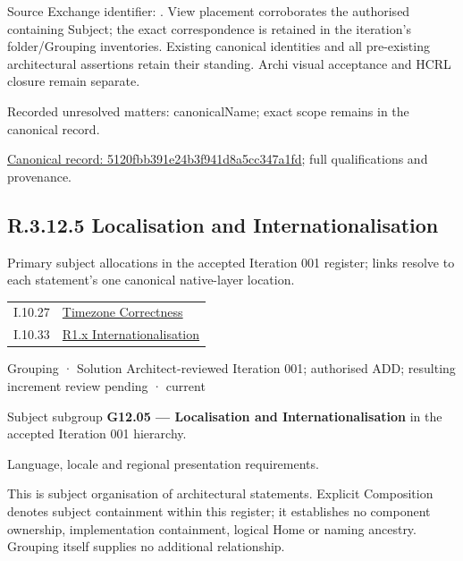 Source Exchange identifier: \texttt{}. View placement corroborates
the authorised containing Subject; the exact correspondence is retained in the
iteration's folder/Grouping inventories. Existing canonical identities and all
pre-existing architectural assertions retain their standing. Archi visual
acceptance and HCRL closure remain separate.


{\small Recorded unresolved matters: canonicalName; exact scope remains in the canonical record.}\par
{\footnotesize \href{../../../../continuum/grouping/5120fbb391e24b3f941d8a5cc347a1fd.md}{Canonical record: 5120fbb391e24b3f941d8a5cc347a1fd}; full qualifications and provenance.}\par
\subsection*{R.3.12.5 Localisation and Internationalisation}
\label{navigation:R.3.12.5}

Primary subject allocations in the accepted Iteration 001 register; links resolve to each statement’s one canonical native-layer location.\par
\begin{longtable}{p{.22\linewidth}p{.73\linewidth}}
I.10.27 & \hyperref[element:3da1fba95a00438db09c342dfba8b693]{Timezone Correctness} \\
I.10.33 & \hyperref[element:920606fdc7c14a27b7e39a08105c77b6]{R1.x Internationalisation} \\
\end{longtable}
\label{element:77cd076a5bdf463a93fe330698d9be19}
{\small Grouping · Solution Architect-reviewed Iteration 001; authorised ADD; resulting increment review pending · current}\par

Subject subgroup \textbf{G12.05 — Localisation and Internationalisation} in the accepted Iteration 001 hierarchy.



Language, locale and regional presentation requirements.



This is subject organisation of architectural statements. Explicit Composition denotes subject containment within this register; it establishes no component ownership, implementation containment, logical Home or naming ancestry. Grouping itself supplies no additional relationship.


